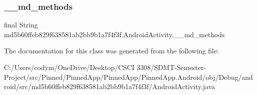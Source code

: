 \subsubsection{\texorpdfstring{\+\_\+\+\_\+md\+\_\+methods}{\_\_md\_methods}}
{\footnotesize\ttfamily final String md5b60ffeb829f638581ab2bb9b1a7f4f3f.\+Android\+Activity.\+\_\+\+\_\+md\+\_\+methods\hspace{0.3cm}{\ttfamily [static]}}



The documentation for this class was generated from the following file\+:\begin{DoxyCompactItemize}
\item 
C\+:/\+Users/codym/\+One\+Drive/\+Desktop/\+C\+S\+C\+I 3308/\+S\+D\+M\+T-\/\+Semester-\/\+Project/src/\+Pinned/\+Pinned\+App/\+Pinned\+App/\+Pinned\+App.\+Android/obj/\+Debug/android/src/md5b60ffeb829f638581ab2bb9b1a7f4f3f/Android\+Activity.\+java\end{DoxyCompactItemize}
